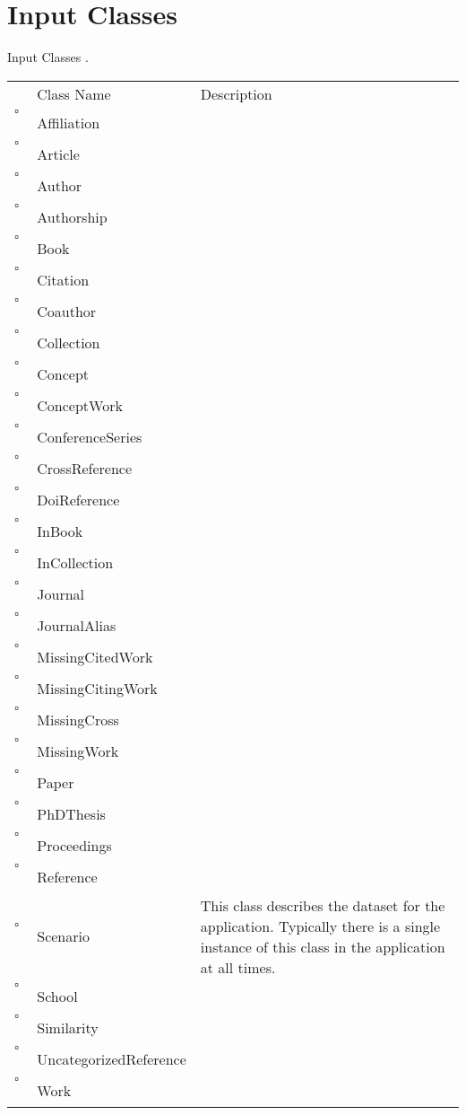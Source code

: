 \chapter{Input Classes}
Input Classes     .
\begin{longtable}{llp{8cm}}
& Class Name & Description \\
$\square$\ & Affiliation &  \\
$\square$\ & Article &  \\
$\square$\ & Author &  \\
$\square$\ & Authorship &  \\
$\square$\ & Book &  \\
$\square$\ & Citation &  \\
$\square$\ & Coauthor &  \\
$\square$\ & Collection &  \\
$\square$\ & Concept &  \\
$\square$\ & ConceptWork &  \\
$\square$\ & ConferenceSeries &  \\
$\square$\ & CrossReference &  \\
$\square$\ & DoiReference &  \\
$\square$\ & InBook &  \\
$\square$\ & InCollection &  \\
$\square$\ & Journal &  \\
$\square$\ & JournalAlias &  \\
$\square$\ & MissingCitedWork &  \\
$\square$\ & MissingCitingWork &  \\
$\square$\ & MissingCross &  \\
$\square$\ & MissingWork &  \\
$\square$\ & Paper &  \\
$\square$\ & PhDThesis &  \\
$\square$\ & Proceedings &  \\
$\square$\ & Reference &  \\
$\square$\ & Scenario & This class describes the dataset for the application. Typically there is a single instance of this class in the application at all times. \\
$\square$\ & School &  \\
$\square$\ & Similarity &  \\
$\square$\ & UncategorizedReference &  \\
$\square$\ & Work &  \\
\end{longtable}
